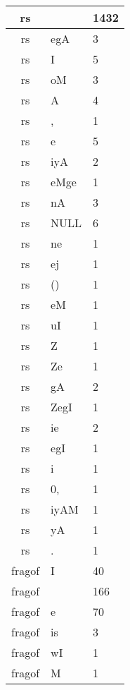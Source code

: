 \documentclass[a4 paper]{article}
\begin{document}
\begin{longtable}{cp{}p{}}
rs &  & 1432\\ \midrule rs & egA & 3\\ \midrule rs & I & 5\\ \midrule rs & oM & 3\\ \midrule rs & A & 4\\ \midrule rs & , & 1\\ \midrule rs & e & 5\\ \midrule rs & iyA & 2\\ \midrule rs & eMge & 1\\ \midrule rs & nA & 3\\ \midrule rs & NULL & 6\\ \midrule rs & ne & 1\\ \midrule rs & ej & 1\\ \midrule rs & () & 1\\ \midrule rs & eM & 1\\ \midrule rs & uI & 1\\ \midrule rs & Z & 1\\ \midrule rs & Ze & 1\\ \midrule rs & gA & 2\\ \midrule rs & ZegI & 1\\ \midrule rs & ie & 2\\ \midrule rs & egI & 1\\ \midrule rs & i & 1\\ \midrule rs & 0, & 1\\ \midrule rs & iyAM & 1\\ \midrule rs & yA & 1\\ \midrule rs & . & 1\\ \midrule 
fragof & I & 40\\ \midrule fragof &  & 166\\ \midrule fragof & e & 70\\ \midrule fragof & is & 3\\ \midrule fragof & wI & 1\\ \midrule fragof & M & 1\\ \midrule 

\end{longtable}
\end{document}
